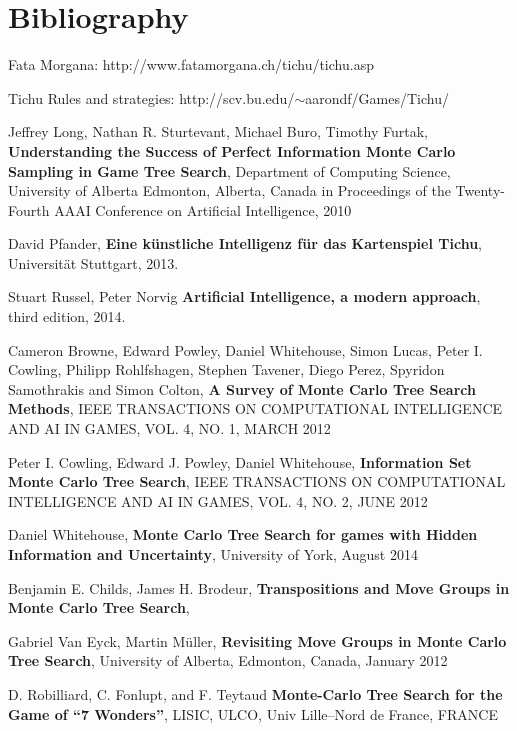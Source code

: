 \chapter*{Bibliography}


\begin{thebibliography}{99}

Fata Morgana: http://www.fatamorgana.ch/tichu/tichu.asp

Tichu Rules and strategies: http://scv.bu.edu/$\sim$aarondf/Games/Tichu/

Jeffrey Long, Nathan R. Sturtevant, Michael Buro, Timothy Furtak,
\textbf{Understanding the Success of Perfect Information Monte Carlo Sampling in Game Tree Search},
Department of Computing Science, University of Alberta Edmonton, Alberta, Canada
in Proceedings of the Twenty-Fourth AAAI Conference on Artificial Intelligence, 2010

David Pfander,
\textbf{Eine künstliche Intelligenz für das Kartenspiel Tichu},
Universität Stuttgart,
2013.

Stuart Russel, Peter Norvig
\textbf{Artificial Intelligence, a modern approach},
third edition,
2014.

Cameron Browne, Edward Powley, Daniel Whitehouse, Simon Lucas, Peter I. Cowling, Philipp Rohlfshagen, Stephen Tavener, Diego Perez, Spyridon Samothrakis and Simon Colton,
\textbf{A Survey of Monte Carlo Tree Search Methods},
IEEE TRANSACTIONS ON COMPUTATIONAL INTELLIGENCE AND AI IN GAMES, VOL. 4, NO. 1,
MARCH 2012

Peter I. Cowling, Edward J. Powley, Daniel Whitehouse,
\textbf{Information Set Monte Carlo Tree Search},
IEEE TRANSACTIONS ON COMPUTATIONAL INTELLIGENCE AND AI IN GAMES, VOL. 4, NO. 2,
JUNE 2012

Daniel Whitehouse,
\textbf{Monte Carlo Tree Search for games with Hidden Information and Uncertainty},
University of York,
August 2014

Benjamin E. Childs, James H. Brodeur,
\textbf{Transpositions and Move Groups in Monte Carlo Tree Search},

Gabriel Van Eyck, Martin Müller,
\textbf{Revisiting Move Groups in Monte Carlo Tree Search},
University of Alberta, Edmonton, Canada,
January 2012

D. Robilliard, C. Fonlupt, and F. Teytaud
\textbf{Monte-Carlo Tree Search for the Game of “7 Wonders”},
LISIC, ULCO, Univ Lille–Nord de France, FRANCE


\end{thebibliography}
